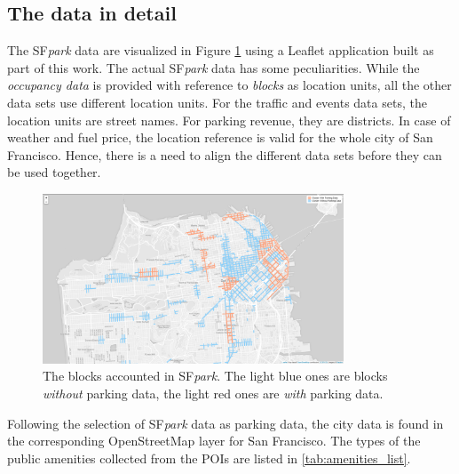 \documentclass{ws-ijait}
\begin{document}
	\subsection{The data in detail}
	The SF\textit{park} data are visualized in Figure \ref{fig:before_clustering} using a Leaflet application built as part of this work.
	The actual SF\textit{park} data has some peculiarities.
	While the \textit{occupancy data} is provided with reference to \textit{blocks} as location units, all the other data sets use different location units.
	For the traffic and events data sets, the location units are street names.
	For parking revenue, they are districts.
	In case of weather and fuel price, the location reference is valid for the whole city of San Francisco. 
	Hence, there is a need to align the different data sets before they can be used together.
	
	\begin{figure}[!ht]
		\centering
		\includegraphics[width=0.8\textwidth]{../graphics/initial_view_before_clusteringV7.png}
		\caption{The blocks accounted in SF\textit{park}. The light blue ones are blocks \textit{without} parking data, the light red ones are \textit{with} parking data.}
		\label{fig:before_clustering}
	\end{figure}
	
	Following the selection of SF\textit{park} data as parking data, the city data is found in the corresponding OpenStreetMap layer for San Francisco.
	The types of the public amenities collected from the POIs are listed in \cref{tab:amenities_list}.
	
\end{document}
